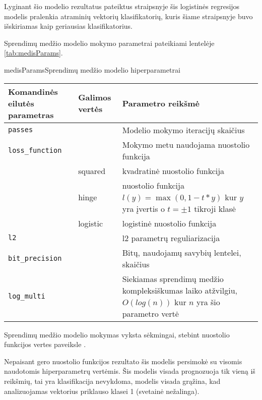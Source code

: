 
Lyginant šio modelio rezultatus pateiktus \cite{comp} straipsnyje šis logistinės regresijos modelis pralenkia
atraminių vektorių klasifikatorių, kuris šiame straipsnyje buvo išskiriamas kaip geriausias klasifikatorius.



Sprendimų medžio modelio mokymo parametrai pateikiami lentelėje \vref{tab:medisParams}.

\begin{ktutable}{medisParams}{Sprendimų medžio modelio hiperparametrai}
    \begin{tabular}{| l | l | p{7cm}|}
    \hline
        Komandinės eilutės parametras & Galimos vertės & Parametro reikšmė\\ \hline
        \texttt{passes} &  & Modelio mokymo iteracijų skaičius \\ \hline
        \texttt{loss\_function} &          & Mokymo metu naudojama nuostolio funkcija \\
                               & squared  & kvadratinė nuostolio funkcija  \\
                               & hinge    & nuostolio funkcija $l(y) = \max(0, 1 - t * y)$ kur $y$ yra įvertis o $t = \pm 1$ tikroji klasė  \\
                               & logistic & logistinė nuostolio funkcija \\ \hline
        \texttt{l2} & & l2 parametrų reguliarizacija \\ \hline
        \texttt{bit\_precision} & & Bitų, naudojamų savybių lentelei, skaičius\\ \hline
        \texttt{log\_multi} & & Siekiamas sprendimų medžio kompleksiškumas laiko atžvilgiu, $O(log(n))$ kur $n$ yra šio parametro vertė\\ \hline
    \end{tabular}
\end{ktutable}

Sprendimų medžio modelio mokymas vyksta sėkmingai, stebint nuostolio funkcijos vertes paveiksle .

Nepaisant gero nuostolio funkcijos rezultato šis modelis persimokė su visomis naudotomis
hiperparametrų vertėmis. Šis modelis visada prognozuoja tik vieną iš reikšmių, tai yra
klasifikacija nevykdoma, modelis visada grąžina, kad analizuojamas vektorius priklauso klasei 1 (svetainė nežalinga).

